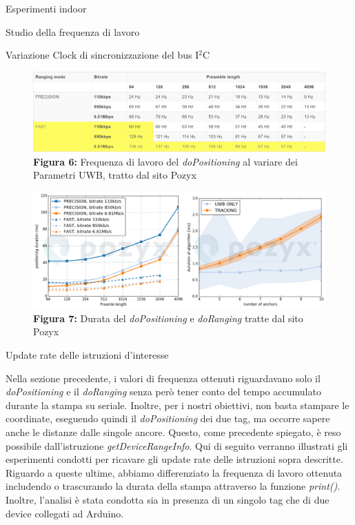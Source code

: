 \documentclass[12pt]{report}
\begin{document}
\begin{section}{Esperimenti indoor}
\begin{subsection}{Studio della frequenza di lavoro}
\begin{subsubsection}{Variazione Clock di sincronizzazione del bus I$^2$C}
			\begin{figure}[h]
				\centering
				\includegraphics[scale=0.26]{pozyx_doPos_freq}
	 			\caption{\textbf{Figura 6:} Frequenza di lavoro del \textit{doPositioning} al variare dei Parametri UWB, tratto dal sito Pozyx}\label{Fdur_pos}
			\end{figure}

			\begin{figure}[h]
				\centering
				\includegraphics[scale=0.17]{durata_pozyx}
	 			\caption{\textbf{Figura 7:} Durata del \textit{doPositioning} e \textit{doRanging} tratte dal sito Pozyx}\label{Fdur_pozyx}
			\end{figure}

		\end{subsubsection}

		\begin{subsubsection}{Update rate delle istruzioni d'interesse}

			Nella sezione precedente, i valori di frequenza ottenuti riguardavano solo il \textit{doPositioning} e il \textit{doRanging} senza però tener conto del tempo accumulato durante la stampa su seriale. Inoltre, per i nostri obiettivi, non basta stampare le coordinate, eseguendo quindi il \textit{doPositioning} dei due 					tag, ma occorre sapere anche le distanze dalle singole ancore. Questo, come precedente spiegato, è reso possibile dall’istruzione \textit{getDeviceRangeInfo}.
			Qui di seguito verranno illustrati gli esperimenti condotti per ricavare gli update rate delle istruzioni sopra descritte. Riguardo a queste ultime, abbiamo differenziato la frequenza di lavoro ottenuta includendo o trascurando la durata della stampa attraverso la funzione \textit{print()}. Inoltre, l’analisi è stata 						condotta sia in presenza di un singolo tag che di due device collegati ad Arduino.


\end{subsubsection}
\end{subsection}
\end{section}
\end{document}
